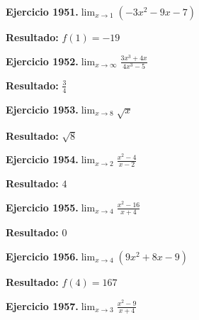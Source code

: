 \documentclass[10pt,a4paper]{article}
\begin{document}
\newpage
\begin{ejbox}
\textbf{Ejercicio 1951.}\quad $\lim_{x\to 1} (-3x^2 -9x -7)$
\end{ejbox}

\begin{solbox}
\textbf{Resultado:} \(\displaystyle f(1) = -19\)
\end{solbox}

\begin{ejbox}
\textbf{Ejercicio 1952.}\quad $\lim_{x\to \infty} \frac{3x^3 + 4x}{4x^3 - 5}$
\end{ejbox}

\begin{solbox}
\textbf{Resultado:} \(\displaystyle \frac{3}{4}\)
\end{solbox}

\begin{ejbox}
\textbf{Ejercicio 1953.}\quad $\lim_{x\to 8} \sqrt{x}$
\end{ejbox}

\begin{solbox}
\textbf{Resultado:} \(\displaystyle \sqrt{8}\)
\end{solbox}

\newpage
\begin{ejbox}
\textbf{Ejercicio 1954.}\quad $\lim_{x\to 2} \frac{x^2-4}{x-2}$
\end{ejbox}

\begin{solbox}
\textbf{Resultado:} \(\displaystyle 4\)
\end{solbox}

\begin{ejbox}
\textbf{Ejercicio 1955.}\quad $\lim_{x\to 4} \frac{x^2-16}{x+4}$
\end{ejbox}

\begin{solbox}
\textbf{Resultado:} \(\displaystyle 0\)
\end{solbox}

\begin{ejbox}
\textbf{Ejercicio 1956.}\quad $\lim_{x\to 4} (9x^2 +8x -9)$
\end{ejbox}

\begin{solbox}
\textbf{Resultado:} \(\displaystyle f(4) = 167\)
\end{solbox}

\newpage
\begin{ejbox}
\textbf{Ejercicio 1957.}\quad $\lim_{x\to 3} \frac{x^2-9}{x+4}$
\end{ejbox}
\end{document}
